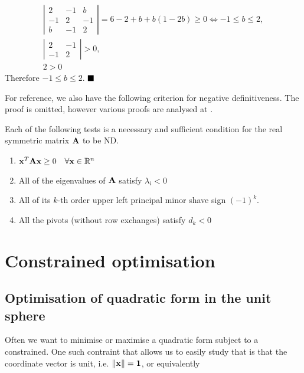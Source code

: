 \documentclass[a4paper]{article}
\numberwithin{equation}{section} %
\newcommand{\setRn}{\mathbb{R}^n} %
\newcommand{\norm}[1] {\lVert #1 \rVert} %
\newcommand{\qedblack}{$\hfill\blacksquare$} %
\newcommand{\B}[1]{\textbf{\textup{#1}}} %
\begin{document}
\begin{TheSolution}
\[
\begin{gathered}
\left| \begin{matrix} 
2 & -1 & b\\-1 & 2 & -1\\b & -1 & 2
 \end{matrix} \right| =
6-2+b+b(1-2b) \geq0 \Leftrightarrow -1 \leq b \leq 2, \\
\left| \begin{matrix}  2 & -1 \\-1 & 2  \end{matrix}\right| >0, \\
2>0
\end{gathered}
\]
Therefore $-1 \leq b \leq 2$. \qedblack
\end{TheSolution}

For reference, we also have the following criterion for negative definitiveness. The proof is omitted, however various proofs are analysed at \cite{giorgi_definitiveness}.
\begin{shaded*}
\begin{theorem}
Each of the following tests is a  necessary and sufficient condition for the real symmetric matrix $\B{A}$ to be ND.
\begin{enumerate}
\item $\B{x}^{T}\B{Ax} \geq0 \quad \forall \B{x} \in \setRn$
\item All of the eigenvalues of $\B{A}$ satisfy $\lambda_i < 0$
\item All of its $k$-th order upper left principal minor shave sign $(-1)^k$.
\item All the pivots (without row exchanges) satisfy $d_k < 0$ 
\end{enumerate}
\label{theorem:negative_definite}
\end{theorem}
\end{shaded*}

\section{Constrained optimisation}

\subsection{Optimisation of quadratic form in the unit sphere}

Often we want to minimise or maximise a quadratic form subject to a constrained. One such contraint that allows us to easily study that is that the coordinate vector is unit, i.e. $\norm{\bf{x}}=1$, or equivalently
\end{document}

